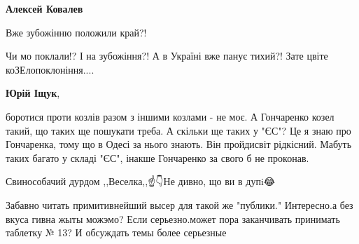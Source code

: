\begin{itemize}
\begin{itemize}
 
\textbf{Алексей Ковалев}

Вже зубожінню положили край?!

Чи мо поклали!? І на зубожіння?! А в Україні вже панує тихий?! Зате цвіте
коЗЕлопоклоніння....


 
\textbf{Юрій Іщук}, 

боротися проти козлів разом з іншими козлами - не моє. А Гончаренко козел
такий, що таких ще пошукати треба. А скільки ще таких у "ЄС"?  Це я знаю про
Гончаренка, тому що в Одесі за нього знають. Він пройдисвіт рідкісний. Мабуть
таких багато у складі "ЄС", інакше Гончаренко за свого б не проконав.

 
Свинособачий дурдом ,,Веселка,,☝👇Не дивно, що ви в дупi😂

\end{itemize}

 

Забавно читать примитивнейший высер для такой же "публики." Интересно.а без
вкуса гивна жыты можэмо? Если серьезно.может пора заканчивать принимать
таблетку № 13? И обсуждать темы более серьезные


 

\end{itemize}
